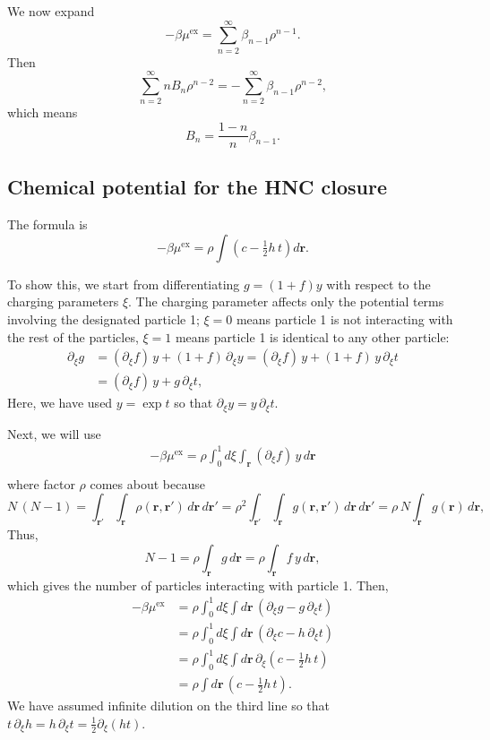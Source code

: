 \documentclass[preprint]{revtex4-1}
\numberwithin{equation}{subsection}
\numberwithin{table}{section}
\newcommand{\vct}[1]{\mathbf{#1}}
\providecommand{\vr}{} %
\renewcommand{\vr}{\vct{r}}
\newcommand{\supex}[1]{ { { #1 }^{ \mathrm{ex} } } }
\newcommand{\muex}{\supex{\mu}}
\begin{document}
We now expand
\begin{equation}
  -\beta \muex = \sum_{n = 2}^\infty \beta_{n-1} \rho^{n-1}.
  \label{eq:expandmu}
\end{equation}
Then
\[
  \sum_{n = 2}^\infty n B_n \rho^{n-2}
=
  -\sum_{n = 2}^\infty \beta_{n-1} \rho^{n-2},
\]
which means
\begin{equation}
  B_n = \frac{1-n}{n}\beta_{n-1}.
  \label{eq:Bbeta}
\end{equation}



\subsection{Chemical potential for the HNC closure}



The formula is
\begin{equation}
  -\beta \muex = \rho \int \left( c - \tfrac{1}{2} h \, t\right) d\vr.
  \label{eq:muex}
\end{equation}

To show this,
we start from differentiating $g = (1+f)y$ with respect to
the charging parameters $\xi$.
The charging parameter affects only the potential terms involving
the designated particle 1;
$\xi = 0$ means particle 1 is not interacting with the rest of the particles,
$\xi = 1$ means particle 1 is identical to any other particle:
\begin{align*}
  \partial_\xi g
  &= (\partial_\xi f) \, y + (1+f) \, \partial_\xi y
  = (\partial_\xi f) \, y + (1+f) \, y \, \partial_\xi t \\
  &= (\partial_\xi f) \, y + g \, \partial_\xi t,
\end{align*}
Here, we have used $y = \exp t$ so that $\partial_\xi y = y \, \partial_\xi t$.

Next, we will use
\begin{align*}
  -\beta \muex
  = \rho \int_0^1 d\xi \int_\vr (\partial_\xi f) \, y \, d\vr \\
\end{align*}
where factor $\rho$ comes about because
\[
   N \, (N - 1)
=
  \int_{\vr'} \int_\vr \rho(\vr, \vr') \, d\vr \, d\vr'
=
  \rho^2 \int_{\vr'}  \int_\vr g(\vr, \vr') \, d\vr \, d\vr'
=
  \rho \, N \int_\vr g(\vr) \, d\vr,
\]
Thus,
\[
  N - 1
  = \rho \int_\vr g \, d\vr
  = \rho \int_\vr f \, y \, d \vr,
\]
which gives the number of particles interacting with particle 1.
%
Then,
\begin{align*}
  -\beta \muex
  &= \rho \int_0^1 d\xi \int d\vr \, (\partial_\xi g - g \, \partial_\xi t) \\
  &= \rho \int_0^1 d\xi \int d\vr \, (\partial_\xi c - h \, \partial_\xi t) \\
  &= \rho \int_0^1 d\xi \int d\vr \, \partial_\xi \left(c - \tfrac{1}{2} h \, t \right) \\
  &= \rho \int d\vr \, \left(c - \tfrac{1}{2} h \, t \right).
\end{align*}
We have assumed infinite dilution on the third line so that
$t \, \partial_\xi h = h \, \partial_\xi t = \tfrac{1}{2} \partial_\xi (h t)$.
\end{document}
